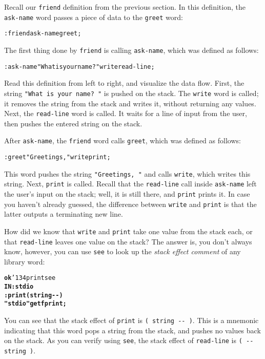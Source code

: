 \documentclass[english]{book}
\newcommand{\ttbackslash}{\char'134}
\begin{document}
Recall our \texttt{friend} definition from the previous section. In this definition, the \texttt{ask-name} word passes a piece of data to the \texttt{greet} word:

\begin{alltt}
: friend ask-name greet ;
\end{alltt}

The first thing done by \texttt{friend} is calling \texttt{ask-name}, which was defined as follows:

\begin{alltt}
: ask-name "What is your name? " write read-line ;
\end{alltt}

Read this definition from left to right, and visualize the data flow. First, the string \texttt{"What is your name?~"} is pushed on the stack. The \texttt{write} word is called; it removes the string from the stack and writes it, without returning any values. Next, the \texttt{read-line} word is called. It waits for a line of input from the user, then pushes the entered string on the stack.

After \texttt{ask-name}, the \texttt{friend} word calls \texttt{greet}, which was defined as follows:

\begin{alltt}
: greet "Greetings, " write print ;
\end{alltt}

This word pushes the string  \texttt{"Greetings, "} and calls \texttt{write}, which writes this string. Next, \texttt{print} is called. Recall that the \texttt{read-line} call inside \texttt{ask-name} left the user's input on the stack; well, it is still there, and \texttt{print} prints it. In case you haven't already guessed, the difference between \texttt{write} and \texttt{print} is that the latter outputs a terminating new line.

How did we know that \texttt{write} and \texttt{print} take one value from the stack each, or that \texttt{read-line} leaves one value on the stack? The answer is, you don't always know, however, you can use \texttt{see} to look up the \emph{stack effect comment} of any library word:

\begin{alltt}
\textbf{ok} \ttbackslash print see
\textbf{IN: stdio
: print ( string -{}- )
    "stdio" get fprint ;}
\end{alltt}

You can see that the stack effect of \texttt{print} is \texttt{( string -{}- )}. This is a mnemonic indicating that this word pops a string from the stack, and pushes no values back on the stack. As you can verify using \texttt{see}, the stack effect of \texttt{read-line} is \texttt{( -{}- string )}.
\end{document}
